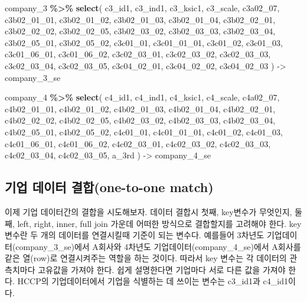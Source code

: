 \documentclass[
]{book}
\newenvironment{Shaded}{\begin{snugshade}}{\end{snugshade}}
\newcommand{\FunctionTok}[1]{\textcolor[rgb]{0.13,0.29,0.53}{\textbf{#1}}}
\newcommand{\NormalTok}[1]{#1}
\newcommand{\OtherTok}[1]{\textcolor[rgb]{0.56,0.35,0.01}{#1}}
\newcommand{\SpecialCharTok}[1]{\textcolor[rgb]{0.81,0.36,0.00}{\textbf{#1}}}
\begin{document}
\begin{Shaded}
\begin{Highlighting}[]
\NormalTok{company\_3 }\SpecialCharTok{\%\textgreater{}\%} 
  \FunctionTok{select}\NormalTok{(}
\NormalTok{    c3\_id1, c3\_ind1, c3\_ksic1, c3\_scale,}
\NormalTok{    c3a02\_07,}
\NormalTok{    c3b02\_01\_01, c3b02\_01\_02, c3b02\_01\_03, c3b02\_01\_04,}
\NormalTok{    c3b02\_02\_01, c3b02\_02\_02, c3b02\_02\_05,}
\NormalTok{    c3b02\_03\_02, c3b02\_03\_03, c3b02\_03\_04,}
\NormalTok{    c3b02\_05\_01, c3b02\_05\_02,}
\NormalTok{    c3c01\_01, c3c01\_01\_01, c3c01\_02, c3c01\_03,}
\NormalTok{    c3c01\_06\_01, c3c01\_06\_02,}
\NormalTok{    c3c02\_03\_01, c3c02\_03\_02, c3c02\_03\_03,}
\NormalTok{    c3c02\_03\_04, c3c02\_03\_05,}
\NormalTok{    c3c04\_02\_01, c3c04\_02\_02, c3c04\_02\_03}
\NormalTok{  ) }\OtherTok{{-}\textgreater{}}\NormalTok{ company\_3\_se}

\NormalTok{company\_4 }\SpecialCharTok{\%\textgreater{}\%} 
  \FunctionTok{select}\NormalTok{(}
\NormalTok{    c4\_id1, c4\_ind1, c4\_ksic1, c4\_scale,}
\NormalTok{    c4a02\_07,}
\NormalTok{    c4b02\_01\_01, c4b02\_01\_02, c4b02\_01\_03, c4b02\_01\_04,}
\NormalTok{    c4b02\_02\_01, c4b02\_02\_02, c4b02\_02\_05,}
\NormalTok{    c4b02\_03\_02, c4b02\_03\_03, c4b02\_03\_04,}
\NormalTok{    c4b02\_05\_01, c4b02\_05\_02,}
\NormalTok{    c4c01\_01, c4c01\_01\_01, c4c01\_02, c4c01\_03,}
\NormalTok{    c4c01\_06\_01, c4c01\_06\_02,}
\NormalTok{    c4c02\_03\_01, c4c02\_03\_02, c4c02\_03\_03,}
\NormalTok{    c4c02\_03\_04, c4c02\_03\_05,}
\NormalTok{    a\_3rd}
\NormalTok{  ) }\OtherTok{{-}\textgreater{}}\NormalTok{ company\_4\_se}
\end{Highlighting}
\end{Shaded}

\subsection{기업 데이터 결합(one-to-one match)}\label{uxae30uxc5c5-uxb370uxc774uxd130-uxacb0uxd569one-to-one-match}

이제 기업 데이터간의 결합을 시도해보자. 데이터 결합시 첫째, key변수가 무엇인지, 둘째, left, right, inner, full join 가운데 어떠한 방식으로 결합할지를 고려해야 한다. key 변수란 두 개의 데이터를 연결시킬때 기준이 되는 변수다. 예를들어 3차년도 기업데이터(company\_3\_se)에서 A회사와 4차년도 기업데이터(company\_4\_se)에서 A회사를 같은 열(row)로 연결시켜주는 역할을 하는 것이다. 따라서 key 변수는 각 데이터의 관측치마다 고유값을 가져야 한다. 쉽게 설명한다면 기업마다 서로 다른 값을 가져야 한다. HCCP의 기업데이터에서 기업을 식별하는 데 쓰이는 변수는 c3\_id1과 c4\_id1이다.
\end{document}
